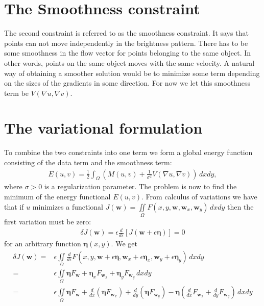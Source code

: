 \documentclass[10pt,a4paper]{article}
\begin{document}
\section{The Smoothness constraint}
The second constraint is referred to as the smoothness constraint. It says that points can not move independently in the brightness pattern. There has to be some smoothness in the flow vector for points belonging to the same object. In other words, points on the same object moves with the same velocity. A natural way of obtaining a smoother solution would be to minimize some term depending on the sizes of the gradients in some direction. For now we let this smoothness term be $V(\nabla u, \nabla v)$.

\section{The variational formulation}
To combine the two constraints into one term we form a global energy function consisting of the data term and the smoothness term:
\begin{align}
E(u,v) = \frac{1}{2} \int_\Omega (M(u,v) + \frac{1}{\sigma^2} V(\nabla u, \nabla v)) \, dx dy,
\end{align}
where $\sigma > 0$ is a regularization parameter. The problem is now to find the minimum of the energy functional $E(u,v)$. From calculus of variations we have that if $u$ minimizes a functional $J(\textbf{w}) = \iint \limits_\Omega F(x,y,\textbf{w},\textbf{w}_x,\textbf{w}_y) \, dxdy$ then the first variation must be zero:
\begin{align*}
\delta J(\textbf{w}) = \epsilon \frac{d}{d \epsilon} \left[ J(\textbf{w} + \epsilon \bm{\eta}) \right] = 0 
\end{align*}
for an arbitrary function $\bm{\eta}(x,y)$. We get
\begin{align*}
\delta J(\textbf{w}) =& \epsilon \iint \limits_{\Omega} \frac{d}{d \epsilon} F(x,y,\textbf{w} + \epsilon \bm{\eta}, \textbf{w}_x + \epsilon \bm{\eta}_x, \textbf{w}_y + \epsilon \bm{\eta}_y) \, dxdy \\
=& \epsilon \iint \limits_{\Omega} \bm{\eta} F_\textbf{w} + \bm{\eta}_x F_{\textbf{w}_x} + \bm{\eta}_y F_{\textbf{w}_y} \, dxdy \\
=& \epsilon \iint \limits_{\Omega} \bm{\eta} F_\textbf{w} + \frac{d}{d x} (\bm{\eta} F_{\textbf{w}_x}) + \frac{d }{d y} (\bm{\eta} F_{\textbf{w}_y}) - \bm{\eta} \left( \frac{d}{d x} F_{\textbf{w}_x} + \frac{d }{d y} F_{\textbf{w}_y} \right) \, dxdy
\end{align*}
\end{document}
